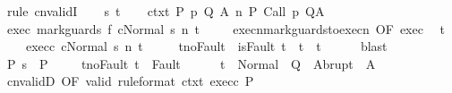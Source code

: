 \begin{isabellebody}
%
\isadelimproof
%
\endisadelimproof
%
\isatagproof
{}\isamarkupfalse%
\ {\isacharparenleft}rule\ cnvalidI{\isacharparenright}\isanewline
\ \ \isamarkupfalse%
\ s\ t\isanewline
\ \ \isamarkupfalse%
\ ctxt{\isacharcolon}\ {\isachardoublequoteopen}{\isasymforall}{\isacharparenleft}P{\isacharcomma}\ p{\isacharcomma}\ Q{\isacharcomma}\ A{\isacharparenright}{\isasymin}{\isasymTheta}{\isachardot}\ {\isasymGamma}{\isasymTurnstile}n{\isacharcolon}\isactrlbsub {\isacharslash}{\isacharbraceleft}{\isacharbraceright}\isactrlesub \ P\ {\isacharparenleft}Call\ p{\isacharparenright}\ Q{\isacharcomma}A{\isachardoublequoteclose}\ \isanewline
\ \ \isamarkupfalse%
\ exec{\isacharcolon}\ {\isachardoublequoteopen}{\isasymGamma}{\isasymturnstile}{\isasymlangle}mark{\isacharunderscore}guards\ f\ c{\isacharcomma}Normal\ s{\isasymrangle}\ {\isacharequal}n{\isasymRightarrow}\ t{\isachardoublequoteclose}\ \isanewline
\ \ \isamarkupfalse%
\ execn{\isacharunderscore}mark{\isacharunderscore}guards{\isacharunderscore}to{\isacharunderscore}execn\ {\isacharbrackleft}OF\ exec{\isacharbrackright}\ \isamarkupfalse%
\ t{\isacharprime}\ \isanewline
\ \ \ \ exec{\isacharunderscore}c{\isacharcolon}\ {\isachardoublequoteopen}{\isasymGamma}{\isasymturnstile}{\isasymlangle}c{\isacharcomma}Normal\ s{\isasymrangle}\ {\isacharequal}n{\isasymRightarrow}\ t{\isacharprime}{\isachardoublequoteclose}\ \isanewline
\ \ \ \ t{\isacharprime}{\isacharunderscore}noFault{\isacharcolon}\ {\isachardoublequoteopen}{\isasymnot}\ isFault\ t{\isacharprime}\ {\isasymlongrightarrow}\ t{\isacharprime}\ {\isacharequal}\ t{\isachardoublequoteclose}\isanewline
\ \ \ \ \isamarkupfalse%
\ blast\isanewline
\ \ \isamarkupfalse%
\ P{\isacharcolon}\ {\isachardoublequoteopen}s\ {\isasymin}\ P{\isachardoublequoteclose}\ \isanewline
\ \ \isamarkupfalse%
\ t{\isacharunderscore}noFault{\isacharcolon}\ {\isachardoublequoteopen}t\ {\isasymnotin}\ Fault\ {\isacharbackquote}\ {\isacharbraceleft}{\isacharbraceright}{\isachardoublequoteclose}\isanewline
\ \ \isamarkupfalse%
\ {\isachardoublequoteopen}t\ {\isasymin}\ Normal\ {\isacharbackquote}\ Q\ {\isasymunion}\ Abrupt\ {\isacharbackquote}\ A{\isachardoublequoteclose}\isanewline
\ \ \isamarkupfalse%
\ {\isacharminus}\isanewline
\ \ \ \ \isamarkupfalse%
\ cnvalidD\ {\isacharbrackleft}OF\ valid\ {\isacharbrackleft}rule{\isacharunderscore}format{\isacharbrackright}\ ctxt\ exec{\isacharunderscore}c\ P{\isacharbrackright}\isanewline

\end{isabellebody}
